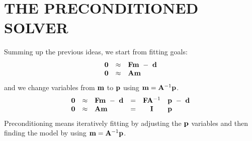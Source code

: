 \section{THE PRECONDITIONED SOLVER}
Summing up the previous ideas,
we start from fitting goals:
\begin{equation}
\begin{array}{lll}
\label{eq:main}
\bold 0 &\approx& \bold F \bold m \ -\  \bold d \\
\bold 0 &\approx& \bold A \bold m
\end{array}
\end{equation}
and we change variables from
$\bold m$ to $\bold p$ using
$\bold m = \bold A^{-1} \bold p$.
\begin{equation}
\begin{array}{llllcl}
\bold 0 &\approx &  \bold F \bold m \ -\  \bold d   &=&
    \bold F  \bold A^{-1} &\bold p  \ -\  \bold d
\\
\bold 0 &\approx &  \bold A \bold m       &=&   \bold I        & \bold p
\end{array}
\label{eqn:precsummary}
\end{equation}
Preconditioning means iteratively fitting
by adjusting the $\bold p$ variables
and then finding the model by using
$\bold m = \bold A^{-1} \bold p$.

\begin{comment}
You notice the following code allows for common additional features,
a weighting function on the data residuals,
starting $\bold p_0$,
masking constraints $\bold J$ on $\bold p$,
and scaling the regularization by an $\epsilon$.
\par
A new reusable
preconditioned solver is
the module \texttt{solver_prc} \vpageref{lst:solver_prc}.
Likewise the modeling operator $\bold F$ is called \texttt{Fop}
and the smoothing operator $\bold A^{-1}$ is called \texttt{Sop}.
Details of the code are only slightly different from
the regularized solver
\texttt{solver-reg} \vpageref{lst:solver-reg}.

\moddex{solver_prc}{Preconditioned solver}
\end{comment}



